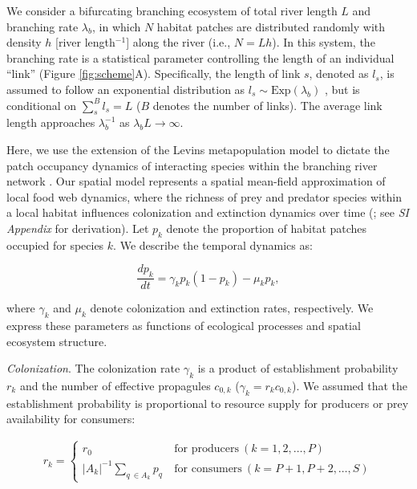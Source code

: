 \documentclass[11pt, class=article, crop=false]{standalone}
\begin{document}
We consider a bifurcating branching ecosystem of total river length $L$ and branching rate $\lambda_b$, in which $N$ habitat patches are distributed randomly with density $h$ [river length$^{-1}$] along the river (i.e., $N = Lh$).
In this system, the branching rate is a statistical parameter controlling the length of an individual ``link'' (Figure \ref{fig:scheme}A).
Specifically, the length of link $s$, denoted as $l_s$, is assumed to follow an exponential distribution as $l_s \sim \mbox{Exp}(\lambda_b)$ \citep{peckham_reformulation_1999, terui_metapopulation_2018, terui_emergent_2021}, but is conditional on $\sum_s^B l_s = L$ ($B$ denotes the number of links).
The average link length approaches $\lambda_b^{-1}$ as $\lambda_b L \rightarrow \infty$.

Here, we use the extension of the Levins metapopulation model to dictate the patch occupancy dynamics of interacting species within the branching river network \citep{calcagno_constraints_2011, takimoto_effects_2012, guo_towards_2023}.
Our spatial model represents a spatial mean-field approximation of local food web dynamics, where the richness of prey and predator species within a local habitat influences colonization and extinction dynamics over time (\citep{shibasaki_food_2024}; see \textit{SI Appendix} for derivation).
Let $p_k$ denote the proportion of habitat patches occupied for species $k$.
We describe the temporal dynamics as:

\begin{equation}
    \frac{dp_k}{dt} = \gamma_{k} p_k (1 - p_k) - \mu_k p_k,
\end{equation}

where $\gamma_k$ and $\mu_k$ denote colonization and extinction rates, respectively.
We express these parameters as functions of ecological processes and spatial ecosystem structure.

\textit{Colonization}. The colonization rate $\gamma_k$ is a product of establishment probability $r_k$ and the number of effective propagules $c_{0,k}$ ($\gamma_k = r_k c_{0,k}$).
We assumed that the establishment probability is proportional to resource supply for producers or prey availability for consumers:

\begin{align}
    r_{k} = 
    \begin{cases}
        r_0 & ~\text{for producers}~ (k=1, 2, \ldots, P)\\
        |A_{k}|^{-1} \sum_{q~\in A_{k}} p_{q} & ~\text{for consumers}~ (k=P+1, P+2, \ldots, S)
    \end{cases}
\end{align}
\end{document}
